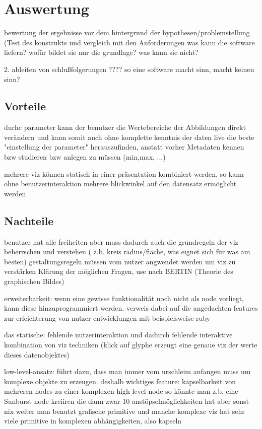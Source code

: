 \documentclass[a4paper, 12pt, onepage, pdftex, headsepline, footsepline]{scrreprt}
\begin{document}
\chapter{Auswertung}
bewertung der ergebnisse vor dem hintergrund der hypothesen/problemstellung (Test des konstrukts und vergleich mit den Anforderungen
was kann die software liefern? wofür bildet sie nur die grundlage? was kann sie nicht?

2. ableiten von schlußfolgerungen
????
so eine software macht sinn, macht keinen sinn?
\section{Vorteile}
durhc parameter kann der benutzer die Wertebereiche der Abbildungen direkt verändern und kann somit auch ohne komplette kenntnis der daten live die beste "einstellung der parameter" herauszufinden, anstatt vorher Metadaten kennen bzw studieren bzw anlegen zu müssen (min,max, ...)

mehrere viz können statisch in einer präsentation kombiniert werden. so kann ohne benutzerinteraktion mehrere blickwinkel auf den datensatz ermöglicht werden

\section{Nachteile}
benutzer hat alle freiheiten aber muss dadurch auch die grundregeln der viz beherrschen und verstehen ( z.b. kreis radius/fläche, was eignet sich für was am besten)
gestaltungsregeln müssen vom nutzer angwendet werden um viz zu verstärken
Klärung der möglichen Fragen, use nach BERTIN (Theorie des graphischen Bildes)

erweiterbarkeit:
wenn eine gewisse funktionalität noch nicht als node vorliegt, kann diese hinzuprogrammiert werden. verweis dabei auf die angedachten features zur erleichterung von nutzer entwicklungen mit beispielsweise ruby

das statische:
fehlende nutzerinteraktion und dadurch fehlende interaktive kombination von viz techniken (klick auf glyphe erzeugt eine genaue viz der werte dieses datenobjektes)

low-level-ansatz:
führt dazu, dass man immer vom urschleim anfangen muss um komplexe objekte zu erzeugen. deshalb wichtiges feature: kapselbarkeit von mehreren nodes zu einer komplexen high-level-node
so könnte man z.b. eine Sunburst node kreiiren die dann zwar 10 anstöpselmöglichkeiten hat aber sonst nix weiter
man benutzt grafische primitive und manche komplexe viz hat sehr viele primitive in komplexen abhängigkeiten, also kapseln
\end{document}

